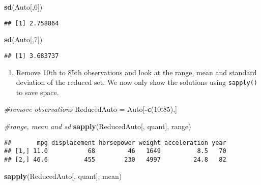 \documentclass[]{article}
\newenvironment{Shaded}{\begin{snugshade}}{\end{snugshade}}
\newcommand{\CommentTok}[1]{\textcolor[rgb]{0.56,0.35,0.01}{\textit{#1}}}
\newcommand{\DecValTok}[1]{\textcolor[rgb]{0.00,0.00,0.81}{#1}}
\newcommand{\KeywordTok}[1]{\textcolor[rgb]{0.13,0.29,0.53}{\textbf{#1}}}
\newcommand{\NormalTok}[1]{#1}
\newcommand{\OperatorTok}[1]{\textcolor[rgb]{0.81,0.36,0.00}{\textbf{#1}}}
\newcommand{\StringTok}[1]{\textcolor[rgb]{0.31,0.60,0.02}{#1}}
\providecommand{\tightlist}{%
  \setlength{\itemsep}{0pt}\setlength{\parskip}{0pt}}
\begin{document}
\begin{Shaded}
\begin{Highlighting}[]
\KeywordTok{sd}\NormalTok{(Auto[,}\DecValTok{6}\NormalTok{])}
\end{Highlighting}
\end{Shaded}

\begin{verbatim}
## [1] 2.758864
\end{verbatim}

\begin{Shaded}
\begin{Highlighting}[]
\KeywordTok{sd}\NormalTok{(Auto[,}\DecValTok{7}\NormalTok{])}
\end{Highlighting}
\end{Shaded}

\begin{verbatim}
## [1] 3.683737
\end{verbatim}

\begin{enumerate}
\def\labelenumi{\alph{enumi})}
\setcounter{enumi}{3}
\tightlist
\item
  Remove 10th to 85th observations and look at the range, mean and
  standard deviation of the reduced set. We now only show the solutions
  using \texttt{sapply()} to save space.
\end{enumerate}

\begin{Shaded}
\begin{Highlighting}[]
\CommentTok{#remove observations}
\NormalTok{ReducedAuto =}\StringTok{ }\NormalTok{Auto[}\OperatorTok{-}\KeywordTok{c}\NormalTok{(}\DecValTok{10}\OperatorTok{:}\DecValTok{85}\NormalTok{),]}

\CommentTok{#range, mean and sd}
\KeywordTok{sapply}\NormalTok{(ReducedAuto[, quant], range)}
\end{Highlighting}
\end{Shaded}

\begin{verbatim}
##       mpg displacement horsepower weight acceleration year
## [1,] 11.0           68         46   1649          8.5   70
## [2,] 46.6          455        230   4997         24.8   82
\end{verbatim}

\begin{Shaded}
\begin{Highlighting}[]
\KeywordTok{sapply}\NormalTok{(ReducedAuto[, quant], mean)}
\end{Highlighting}
\end{Shaded}
\end{document}
